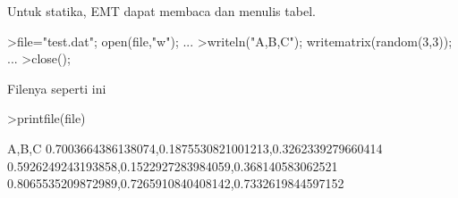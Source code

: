 \documentclass{article}
\begin{document}
\begin{eulernotebook}
\begin{eulercomment}
Untuk statika, EMT dapat membaca dan menulis tabel.
\end{eulercomment}
\begin{eulerprompt}
>file="test.dat"; open(file,"w"); ...
>writeln("A,B,C"); writematrix(random(3,3)); ...
>close();
\end{eulerprompt}
\begin{eulercomment}
Filenya seperti ini
\end{eulercomment}
\begin{eulerprompt}
>printfile(file)
\end{eulerprompt}
\begin{euleroutput}
  A,B,C
  0.7003664386138074,0.1875530821001213,0.3262339279660414
  0.5926249243193858,0.1522927283984059,0.368140583062521
  0.8065535209872989,0.7265910840408142,0.7332619844597152
  

\end{euleroutput}
\end{eulernotebook}
\end{document}
